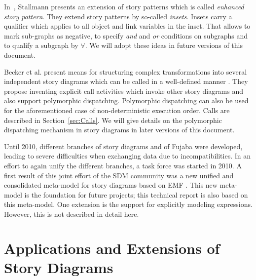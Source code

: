 In~\cite{Sta08}, Stallmann presents an extension of story patterns which is called \emph{enhanced story pattern}. They extend story patterns by so-called \emph{insets}. Insets carry a qualifier which applies to all object and link variables in the inset. That allows to mark sub-graphs as negative, to specify \emph{and} and \emph{or} conditions on subgraphs and to qualify a subgraph by $\forall$. We will adopt these ideas in future versions of this document.

Becker et al. present means for structuring complex transformations into several independent story diagrams which can be called in a well-defined manner \cite{BvDHR11}.
They propose inventing explicit call activities which invoke other story diagrams and also support polymorphic dispatching.
Polymorphic dispatching can also be used for the aforementioned case of non-deterministic execution order.
Calls are described in Section~\ref{sec:Calls}.
We will give details on the polymorphic dispatching mechanism in story diagrams in later versions of this document.

Until 2010, different branches of story diagrams and of Fujaba were developed, leading to severe difficulties when exchanging data due to incompatibilities.
In an effort to again unify the different branches, a task force was started in 2010.
A first result of this joint effort of the SDM community was a new unified and consolidated meta-model for story diagrams based on EMF \cite{HRvD+11}.
This new meta-model is the foundation for future projects; this technical report is also based on this meta-model.
One extension is the support for explicitly modeling expressions.
However, this is not described in detail here.













\section{Applications and Extensions of Story Diagrams}
\label{sec:RW_Extensions}


